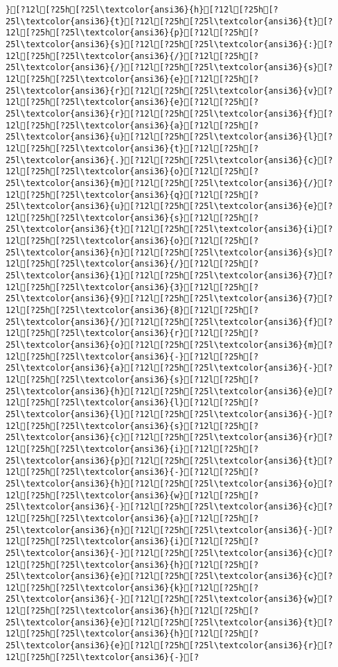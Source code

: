 \documentclass{scrartcl}
\begin{document}
\begin{Verbatim}
}[?12l[?25h[?25l\textcolor{ansi36}{h}[?12l[?25h[?25l\textcolor{ansi36}{t}[?12l[?25h[?25l\textcolor{ansi36}{t}[?12l[?25h[?25l\textcolor{ansi36}{p}[?12l[?25h[?25l\textcolor{ansi36}{s}[?12l[?25h[?25l\textcolor{ansi36}{:}[?12l[?25h[?25l\textcolor{ansi36}{/}[?12l[?25h[?25l\textcolor{ansi36}{/}[?12l[?25h[?25l\textcolor{ansi36}{s}[?12l[?25h[?25l\textcolor{ansi36}{e}[?12l[?25h[?25l\textcolor{ansi36}{r}[?12l[?25h[?25l\textcolor{ansi36}{v}[?12l[?25h[?25l\textcolor{ansi36}{e}[?12l[?25h[?25l\textcolor{ansi36}{r}[?12l[?25h[?25l\textcolor{ansi36}{f}[?12l[?25h[?25l\textcolor{ansi36}{a}[?12l[?25h[?25l\textcolor{ansi36}{u}[?12l[?25h[?25l\textcolor{ansi36}{l}[?12l[?25h[?25l\textcolor{ansi36}{t}[?12l[?25h[?25l\textcolor{ansi36}{.}[?12l[?25h[?25l\textcolor{ansi36}{c}[?12l[?25h[?25l\textcolor{ansi36}{o}[?12l[?25h[?25l\textcolor{ansi36}{m}[?12l[?25h[?25l\textcolor{ansi36}{/}[?12l[?25h[?25l\textcolor{ansi36}{q}[?12l[?25h[?25l\textcolor{ansi36}{u}[?12l[?25h[?25l\textcolor{ansi36}{e}[?12l[?25h[?25l\textcolor{ansi36}{s}[?12l[?25h[?25l\textcolor{ansi36}{t}[?12l[?25h[?25l\textcolor{ansi36}{i}[?12l[?25h[?25l\textcolor{ansi36}{o}[?12l[?25h[?25l\textcolor{ansi36}{n}[?12l[?25h[?25l\textcolor{ansi36}{s}[?12l[?25h[?25l\textcolor{ansi36}{/}[?12l[?25h[?25l\textcolor{ansi36}{1}[?12l[?25h[?25l\textcolor{ansi36}{7}[?12l[?25h[?25l\textcolor{ansi36}{3}[?12l[?25h[?25l\textcolor{ansi36}{9}[?12l[?25h[?25l\textcolor{ansi36}{7}[?12l[?25h[?25l\textcolor{ansi36}{8}[?12l[?25h[?25l\textcolor{ansi36}{/}[?12l[?25h[?25l\textcolor{ansi36}{f}[?12l[?25h[?25l\textcolor{ansi36}{r}[?12l[?25h[?25l\textcolor{ansi36}{o}[?12l[?25h[?25l\textcolor{ansi36}{m}[?12l[?25h[?25l\textcolor{ansi36}{-}[?12l[?25h[?25l\textcolor{ansi36}{a}[?12l[?25h[?25l\textcolor{ansi36}{-}[?12l[?25h[?25l\textcolor{ansi36}{s}[?12l[?25h[?25l\textcolor{ansi36}{h}[?12l[?25h[?25l\textcolor{ansi36}{e}[?12l[?25h[?25l\textcolor{ansi36}{l}[?12l[?25h[?25l\textcolor{ansi36}{l}[?12l[?25h[?25l\textcolor{ansi36}{-}[?12l[?25h[?25l\textcolor{ansi36}{s}[?12l[?25h[?25l\textcolor{ansi36}{c}[?12l[?25h[?25l\textcolor{ansi36}{r}[?12l[?25h[?25l\textcolor{ansi36}{i}[?12l[?25h[?25l\textcolor{ansi36}{p}[?12l[?25h[?25l\textcolor{ansi36}{t}[?12l[?25h[?25l\textcolor{ansi36}{-}[?12l[?25h[?25l\textcolor{ansi36}{h}[?12l[?25h[?25l\textcolor{ansi36}{o}[?12l[?25h[?25l\textcolor{ansi36}{w}[?12l[?25h[?25l\textcolor{ansi36}{-}[?12l[?25h[?25l\textcolor{ansi36}{c}[?12l[?25h[?25l\textcolor{ansi36}{a}[?12l[?25h[?25l\textcolor{ansi36}{n}[?12l[?25h[?25l\textcolor{ansi36}{-}[?12l[?25h[?25l\textcolor{ansi36}{i}[?12l[?25h[?25l\textcolor{ansi36}{-}[?12l[?25h[?25l\textcolor{ansi36}{c}[?12l[?25h[?25l\textcolor{ansi36}{h}[?12l[?25h[?25l\textcolor{ansi36}{e}[?12l[?25h[?25l\textcolor{ansi36}{c}[?12l[?25h[?25l\textcolor{ansi36}{k}[?12l[?25h[?25l\textcolor{ansi36}{-}[?12l[?25h[?25l\textcolor{ansi36}{w}[?12l[?25h[?25l\textcolor{ansi36}{h}[?12l[?25h[?25l\textcolor{ansi36}{e}[?12l[?25h[?25l\textcolor{ansi36}{t}[?12l[?25h[?25l\textcolor{ansi36}{h}[?12l[?25h[?25l\textcolor{ansi36}{e}[?12l[?25h[?25l\textcolor{ansi36}{r}[?12l[?25h[?25l\textcolor{ansi36}{-}[?
\end{Verbatim}
\end{document}
